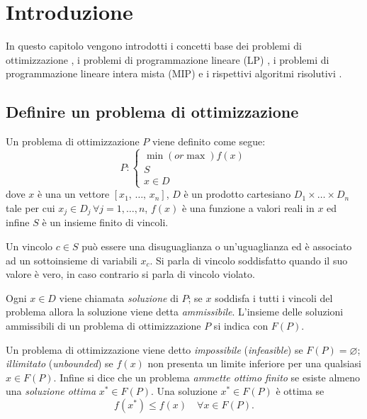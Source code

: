 \chapter{Introduzione}%
\label{cha:Introduzione}
In questo capitolo vengono introdotti i concetti base dei problemi di
ottimizzazione \cite{introOttimizz}, i problemi di programmazione lineare (LP)
\cite{cenniLp}, i problemi di programmazione lineare intera mista (MIP) e i 
rispettivi algoritmi risolutivi \cite{cenniMip}.

\section{Definire un problema di ottimizzazione}
\label{sec:Introduzione}
Un problema di ottimizzazione $P$ viene definito come segue:
\begin{equation}
    P:
    \begin{cases}
        \min (\textit{or} \max)f(x)\\
        S\\
        x \in D
    \end{cases}
\end{equation}
dove $x$ è una un vettore $[x_1,\, \ldots,\, x_n]$, $D$ è un prodotto cartesiano 
$D_1 \times \ldots \times D_n$ tale per cui $x_j \in D_j\,\forall j = 1,\ldots,n$,
$f(x)$ è una funzione a valori reali in $x$ ed infine $S$ è un insieme finito 
di vincoli.

Un vincolo $c \in S$ può essere una disuguaglianza o un'uguaglianza ed è
associato ad un sottoinsieme di variabili $x_c$.
Si parla di vincolo soddisfatto quando il suo valore è vero, in caso contrario
si parla di vincolo violato.

Ogni $x\in D$ viene chiamata \textit{soluzione} di $P$; se $x$ soddisfa i tutti i 
vincoli del problema allora la soluzione viene detta \textit{ammissibile}. 
L'insieme delle soluzioni ammissibili di un problema di ottimizzazione 
$P$ si indica con $F(P)$.

Un problema di ottimizzazione viene detto \textit{impossibile} (\textit{infeasible})
se $F(P) = \varnothing$; \textit{illimitato} (\textit{unbounded})
se $f(x)$ non presenta un limite inferiore per una qualsiasi $x \in F(P)$.
Infine si dice che un problema \textit{ammette ottimo finito} se esiste almeno
una \textit{soluzione ottima} $x^*\in F(P)$.
Una soluzione $x^*\in F(P)$ è ottima se
\begin{equation}
    f(x^*) \leq f(x) \quad \forall x \in F(P).
\end{equation}

